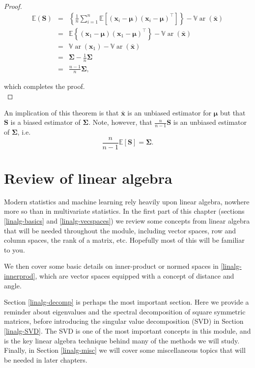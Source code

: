 \documentclass[]{book}
\theoremstyle{definition}
\theoremstyle{definition}
\theoremstyle{definition}
\theoremstyle{remark}
\begin{document}
\begin{proof}
\begin{eqnarray*}
{\mathbb{E}}(\boldsymbol S)&=&\left \{\frac{1}{n}\sum_{i=1}^n {\mathbb{E}}\left [(\boldsymbol x_i - \boldsymbol \mu)(\boldsymbol x_i - \boldsymbol \mu)^\top \right ]\right \} -{\mathbb{V}\operatorname{ar}}(\bar{\boldsymbol x})\\
&=&{\mathbb{E}}\left \{(\boldsymbol x_1 - \boldsymbol \mu)(\boldsymbol x_1  - \boldsymbol \mu)^\top \right \} -{\mathbb{V}\operatorname{ar}}(\bar{\boldsymbol x})\\
&=& {\mathbb{V}\operatorname{ar}}(\boldsymbol x_1)-{\mathbb{V}\operatorname{ar}}(\bar{\boldsymbol x}) \\
&=& \boldsymbol \Sigma- \frac{1}{n}\boldsymbol \Sigma\\
&=& \frac{n-1}{n}  \boldsymbol \Sigma,
\end{eqnarray*}

which completes the proof.\\
\end{proof}

An implication of this theorem is that \(\bar{\boldsymbol x}\) is an unbiased estimator for \(\boldsymbol \mu\) but that \(\boldsymbol S\) is a biased estimator of \(\boldsymbol \Sigma\). Note, however, that \({\displaystyle\frac{n}{n-1}} \boldsymbol S\) is an unbiased estimator of \(\boldsymbol \Sigma\), i.e.
\[
 \frac{n}{n-1}{\mathbb{E}}[\boldsymbol S]=\boldsymbol \Sigma.
 \]

\hypertarget{linalg-prelim}{%
\chapter{Review of linear algebra}\label{linalg-prelim}}

Modern statistics and machine learning rely heavily upon linear algebra, nowhere more so than in multivariate statistics. In the first part of this chapter (sections \ref{linalg-basics} and \ref{linalg-vecspaces}) we review some concepts from linear algebra that will be needed throughout the module, including vector spaces, row and column spaces, the rank of a matrix, etc. Hopefully most of this will be familiar to you.

We then cover some basic details on inner-product or normed spaces in \ref{linalg-innerprod}, which are vector spaces equipped with a concept of distance and angle.

Section \ref{linalg-decomp} is perhaps the most important section. Here we provide a reminder about eigenvalues and the spectral decomposition of square symmetric matrices, before introducing the singular value decomposition (SVD) in Section \ref{linalg-SVD}. The SVD is one of the most important concepts in this module, and is the key linear algebra technique behind many of the methods we will study. Finally, in Section \ref{linalg-misc} we will cover some miscellaneous topics that will be needed in later chapters.
\end{document}
